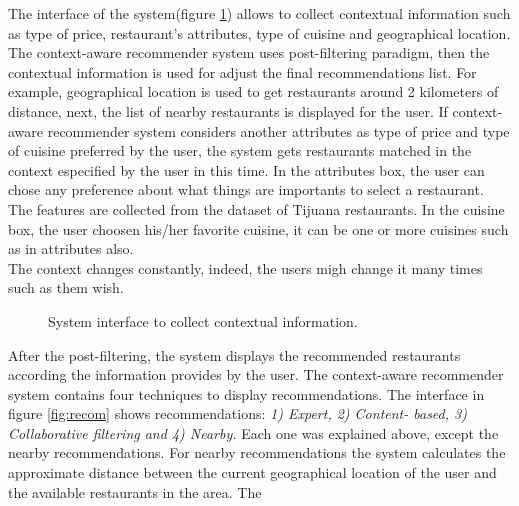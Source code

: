 The interface of the system(figure \ref{fig:context}) allows to
collect contextual information such as type of price, restaurant's
attributes, type of cuisine and geographical location. The context-aware recommender system uses post-filtering paradigm, then the
contextual information is used for adjust the final recommendations
list. For example, geographical location is used to get restaurants
around 2 kilometers of distance, next, the list of nearby restaurants
is displayed for the user. If context-aware recommender system
considers another attributes as type of price and type of cuisine
preferred by the user, the system gets restaurants matched in the
context especified by the user in this time. In the attributes box,
the user can chose any preference about what things are importants to
select a restaurant. The features are collected from the dataset of
Tijuana restaurants. In the cuisine box, the user choosen his/her
favorite cuisine, it can be one or more cuisines such as in attributes 
also.\\  
The context changes constantly, indeed, the users migh change 
it many times such as them wish.
\begin{figure}
\captionsetup{justification=centering,margin=2cm,font=footnotesize}
\centering
{}
\caption{System interface to collect contextual information.}
\label{fig:context}   
\end{figure}
After the post-filtering, the system displays the  recommended
restaurants according the information provides by the user. The
context-aware recommender system contains four techniques to display
recommendations. The interface in figure \ref{fig:recom} shows
recommendations: \textit{1) Expert, 2) Content- based, 3) Collaborative
filtering and 4) Nearby.} Each one was explained above, except the
nearby recommendations. For nearby recommendations the system
calculates the approximate distance between the current geographical
location of the user and the available restaurants in the area.  The
